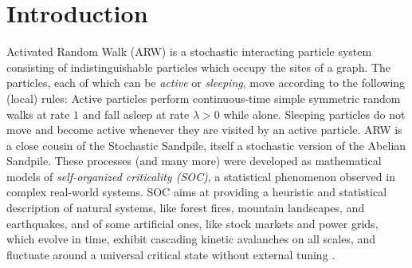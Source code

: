 \documentclass[ECP]{ejpecp} %
\begin{document}

\section{Introduction}
\label{sec1}

Activated Random Walk (ARW) is a stochastic interacting particle system
consisting of indistinguishable particles which occupy the sites of a graph.
The particles, each of which can be {\em{active}} or {\em{sleeping}}, move
according to the following (local) rules: Active particles perform continuous-time
simple symmetric random walks at rate $1$ and fall asleep at rate
$\lambda > 0$ while alone. Sleeping particles do not move and become active
whenever they are visited by an active particle. ARW is a close cousin
of the Stochastic Sandpile, itself a stochastic version of the Abelian
Sandpile. These processes (and many more) were developed as mathematical
models of \emph{self-organized criticality (SOC)}, a statistical phenomenon
observed in complex real-world systems. SOC aims at providing a heuristic
and statistical description of natural systems, like forest fires, mountain
landscapes, and earthquakes, and of some artificial ones, like stock markets
and power grids, which evolve in time, exhibit cascading kinetic avalanches
on all scales, and fluctuate around a universal critical state without
external tuning \cite{BakTangWiesenfeld87,watkins2016twentyfive}.
\end{document}
